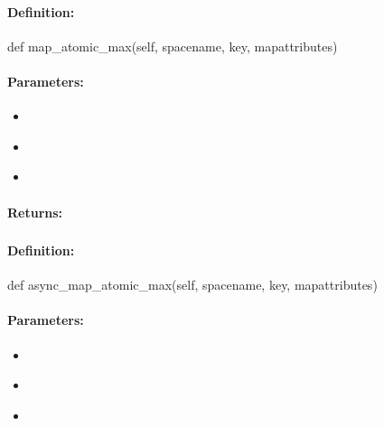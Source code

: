 \paragraph{Definition:}
\begin{pythoncode}
def map_atomic_max(self, spacename, key, mapattributes)
\end{pythoncode}

\paragraph{Parameters:}
\begin{itemize}[noitemsep]
\item {}\\

\item {}\\

\item {}\\

\end{itemize}

\paragraph{Returns:}


\pagebreak
\subsubsection{}
\label{api:python:async_map_atomic_max}


\paragraph{Definition:}
\begin{pythoncode}
def async_map_atomic_max(self, spacename, key, mapattributes)
\end{pythoncode}

\paragraph{Parameters:}
\begin{itemize}[noitemsep]
\item {}\\

\item {}\\

\item {}\\

\end{itemize}

